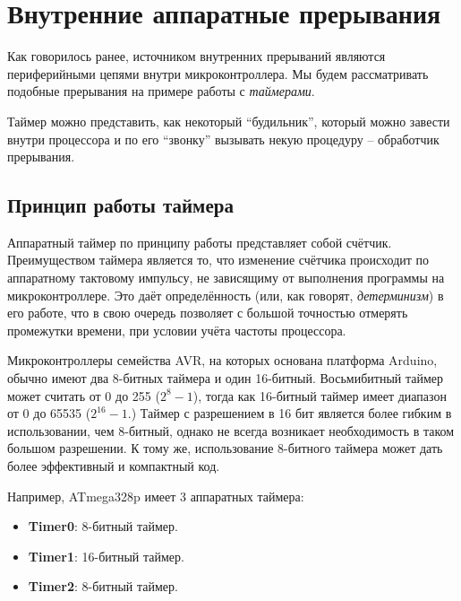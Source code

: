 \documentclass[../sparc.tex]{subfiles}
\begin{document}
\newpage
\section{Внутренние аппаратные прерывания}

Как говорилось ранее, источником внутренних прерываний являются периферийными
цепями внутри микроконтроллера.  Мы будем рассматривать подобные прерывания на
примере работы с \emph{таймерами}.

Таймер можно представить, как некоторый ``будильник'', который можно завести
внутри процессора и по его ``звонку'' вызывать некую процедуру -- обработчик
прерывания.

\subsection{Принцип работы таймера}

Аппаратный таймер по принципу работы представляет собой счётчик.  Преимуществом
таймера является то, что изменение счётчика происходит по аппаратному тактовому
импульсу, не зависящиму от выполнения программы на микроконтроллере.  Это даёт
определённость (или, как говорят, \emph{детерминизм}) в его работе, что в свою
очередь позволяет с большой точностью отмерять промежутки времени, при условии
учёта частоты процессора.

Микроконтроллеры семейства AVR, на которых основана платформа Arduino, обычно
имеют два 8-битных таймера и один 16-битный.  Восьмибитный таймер может считать
от 0 до 255 ($2^{8}-1$), тогда как 16-битный таймер имеет диапазон от 0 до 65535
($2^{16}-1$.)  Таймер с разрешением в 16 бит является более гибким в
использовании, чем 8-битный, однако не всегда возникает необходимость в таком
большом разрешении.  К тому же, использование 8-битного таймера может дать более
эффективный и компактный код.\cite{avr:timers}

Например, ATmega328p имеет 3 аппаратных таймера:
\begin{itemize}
\item \textbf{Timer0}: 8-битный таймер.
\item \textbf{Timer1}: 16-битный таймер.
\item \textbf{Timer2}: 8-битный таймер.
\end{itemize}
\end{document}
